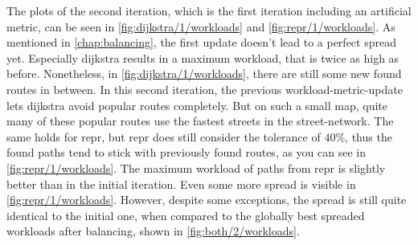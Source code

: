         The plots of the second iteration, which is the first iteration including an artificial \gls{metric}, can be seen in \cref{fig:dijkstra/1/workloads} and \vref{fig:repr/1/workloads}.
        As mentioned in \vref{chap:balancing}, the first update doesn't lead to a perfect spread yet.
        Especially \gls{dijkstra} results in a maximum workload, that is twice as high as before.
        Nonetheless, in \cref{fig:dijkstra/1/workloads}, there are still some new found routes in between.
        In this second iteration, the previous workload-\gls{metric}-update lets \gls{dijkstra} avoid popular routes completely.
        But on such a small map, quite many of these popular routes use the fastest streets in the street-network.
        The same holds for \gls{repr}, but \gls{repr} does still consider the tolerance of $\si{40 \percent}$, thus the found paths tend to stick with previously found routes, as you can see in \cref{fig:repr/1/workloads}.
        The maximum workload of paths from \gls{repr} is slightly better than in the initial iteration.
        Even some more spread is visible in \cref{fig:repr/1/workloads}.
        However, despite some exceptions, the spread is still quite identical to the initial one, when compared to the globally best spreaded workloads after \gls{balancing}, shown in \vref{fig:both/2/workloads}.

